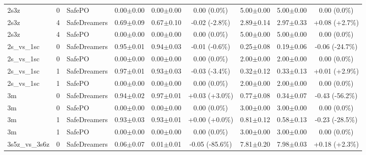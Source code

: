 \documentclass{article}
\begin{document}
\begin{longtable}{lclcccccc}
2s3z & 0 & SafePO & 0.00$\pm$0.00 & 0.00$\pm$0.00 & \textcolor{red!40!black}{0.00 (0.0\%)} & 5.00$\pm$0.00 & 5.00$\pm$0.00 & \textcolor{green!40!black}{0.00 (0.0\%)} \\
2s3z & 4 & SafeDreamers & 0.69$\pm$0.09 & 0.67$\pm$0.10 & \textcolor{red!40!black}{-0.02 (-2.8\%)} & 2.89$\pm$0.14 & 2.97$\pm$0.33 & \textcolor{red!40!black}{+0.08 (+2.7\%)} \\
2s3z & 4 & SafePO & 0.00$\pm$0.00 & 0.00$\pm$0.00 & \textcolor{red!40!black}{0.00 (0.0\%)} & 5.00$\pm$0.00 & 5.00$\pm$0.00 & \textcolor{green!40!black}{0.00 (0.0\%)} \\
\midrule
2s\_vs\_1sc & 0 & SafeDreamers & 0.95$\pm$0.01 & 0.94$\pm$0.03 & \textcolor{red!40!black}{-0.01 (-0.6\%)} & 0.25$\pm$0.08 & 0.19$\pm$0.06 & \textcolor{green!70!black}{-0.06 (-24.7\%)} \\
2s\_vs\_1sc & 0 & SafePO & 0.00$\pm$0.00 & 0.00$\pm$0.00 & \textcolor{red!40!black}{0.00 (0.0\%)} & 2.00$\pm$0.00 & 2.00$\pm$0.00 & \textcolor{green!40!black}{0.00 (0.0\%)} \\
2s\_vs\_1sc & 1 & SafeDreamers & 0.97$\pm$0.01 & 0.93$\pm$0.03 & \textcolor{red!40!black}{-0.03 (-3.4\%)} & 0.32$\pm$0.12 & 0.33$\pm$0.13 & \textcolor{red!40!black}{+0.01 (+2.9\%)} \\
2s\_vs\_1sc & 1 & SafePO & 0.00$\pm$0.00 & 0.00$\pm$0.00 & \textcolor{red!40!black}{0.00 (0.0\%)} & 2.00$\pm$0.00 & 2.00$\pm$0.00 & \textcolor{green!40!black}{0.00 (0.0\%)} \\
\midrule
3m & 0 & SafeDreamers & 0.94$\pm$0.02 & 0.97$\pm$0.01 & \textcolor{green!40!black}{+0.03 (+3.0\%)} & 0.77$\pm$0.08 & 0.34$\pm$0.07 & \textcolor{green!100!black}{-0.43 (-56.2\%)} \\
3m & 0 & SafePO & 0.00$\pm$0.00 & 0.00$\pm$0.00 & \textcolor{red!40!black}{0.00 (0.0\%)} & 3.00$\pm$0.00 & 3.00$\pm$0.00 & \textcolor{green!40!black}{0.00 (0.0\%)} \\
3m & 1 & SafeDreamers & 0.93$\pm$0.03 & 0.93$\pm$0.01 & \textcolor{green!40!black}{+0.00 (+0.0\%)} & 0.81$\pm$0.12 & 0.58$\pm$0.13 & \textcolor{green!70!black}{-0.23 (-28.5\%)} \\
3m & 1 & SafePO & 0.00$\pm$0.00 & 0.00$\pm$0.00 & \textcolor{red!40!black}{0.00 (0.0\%)} & 3.00$\pm$0.00 & 3.00$\pm$0.00 & \textcolor{green!40!black}{0.00 (0.0\%)} \\
\midrule
3s5z\_vs\_3s6z & 0 & SafeDreamers & 0.06$\pm$0.07 & 0.01$\pm$0.01 & \textcolor{red!100!black}{-0.05 (-85.6\%)} & 7.81$\pm$0.20 & 7.98$\pm$0.03 & \textcolor{red!40!black}{+0.18 (+2.3\%)} \\

\end{longtable}
\end{document}
